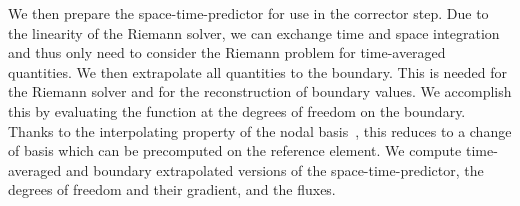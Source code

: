 We then prepare the space-time-predictor for use in the corrector step.
Due to the linearity of the Riemann solver, we can exchange time and space integration and thus only need to consider the Riemann problem for time-averaged quantities.
We then extrapolate all quantities to the boundary.
This is needed for the Riemann solver and for the reconstruction of boundary values.
We accomplish this by evaluating the function at the degrees of freedom on the boundary.
Thanks to the interpolating property of the nodal basis~, this reduces to a change of basis which can be precomputed on the reference element.
We compute time-averaged and boundary extrapolated versions of the space-time-predictor, the degrees of freedom and their gradient, and the fluxes. 

